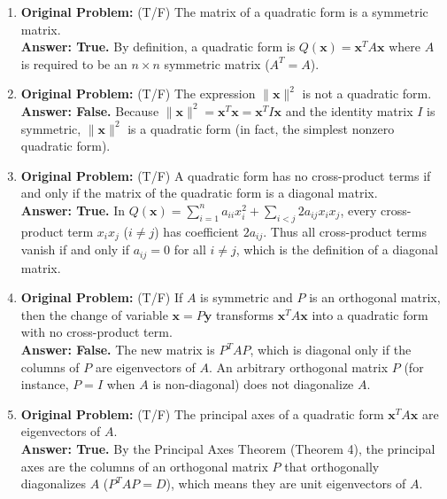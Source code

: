 \documentclass[11pt, letterpaper]{article}
\theoremstyle{definition}
\theoremstyle{remark}
\begin{document}
\begin{enumerate}[start=21]
    \item \textbf{Original Problem:} (T/F) The matrix of a quadratic form is a symmetric matrix. \\
    \textbf{Answer: True.} By definition, a quadratic form is $Q(\mathbf{x}) = \mathbf{x}^T A \mathbf{x}$ where $A$ is required to be an $n \times n$ symmetric matrix ($A^T = A$).

    \item \textbf{Original Problem:} (T/F) The expression $\|\mathbf{x}\|^2$ is not a quadratic form. \\
    \textbf{Answer: False.} Because $\|\mathbf{x}\|^2 = \mathbf{x}^T \mathbf{x} = \mathbf{x}^T I \mathbf{x}$ and the identity matrix $I$ is symmetric, $\|\mathbf{x}\|^2$ is a quadratic form (in fact, the simplest nonzero quadratic form).

    \item \textbf{Original Problem:} (T/F) A quadratic form has no cross-product terms if and only if the matrix of the quadratic form is a diagonal matrix. \\
    \textbf{Answer: True.} In $Q(\mathbf{x}) = \sum_{i=1}^n a_{ii} x_i^2 + \sum_{i < j} 2a_{ij} x_i x_j$, every cross-product term $x_i x_j$ ($i \ne j$) has coefficient $2a_{ij}$. Thus all cross-product terms vanish if and only if $a_{ij} = 0$ for all $i \ne j$, which is the definition of a diagonal matrix.

    \item \textbf{Original Problem:} (T/F) If $A$ is symmetric and $P$ is an orthogonal matrix, then the change of variable $\mathbf{x} = P\mathbf{y}$ transforms $\mathbf{x}^T A \mathbf{x}$ into a quadratic form with no cross-product term. \\
    \textbf{Answer: False.} The new matrix is $P^T A P$, which is diagonal only if the columns of $P$ are eigenvectors of $A$. An arbitrary orthogonal matrix $P$ (for instance, $P = I$ when $A$ is non-diagonal) does not diagonalize $A$.

    \item \textbf{Original Problem:} (T/F) The principal axes of a quadratic form $\mathbf{x}^T A \mathbf{x}$ are eigenvectors of $A$. \\
    \textbf{Answer: True.} By the Principal Axes Theorem (Theorem 4), the principal axes are the columns of an orthogonal matrix $P$ that orthogonally diagonalizes $A$ ($P^T A P = D$), which means they are unit eigenvectors of $A$.


\end{enumerate}
\end{document}
